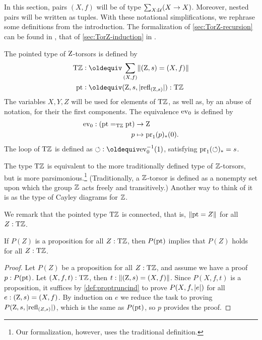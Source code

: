 \documentclass[a4paper,12pt]{amsart}
\begin{document}
{In this section, pairs $(X,f)$ will be of type $\sum_{X:\mathcal{U}}(X\to X)$.}
Moreover, nested pairs will be written as tuples.
With these notational simplifications, we rephrase some definitions from the introduction.
{The formalization of \cref{sec:TorZ-recursion} can be found in \cite{circlerec-Dan},
that of \cref{sec:TorZ-induction} in \cite{circleind-Dan}.}

\begin{definition}\label{def:TorZ}
  The pointed type of $\mathrm{Z}$-torsors is defined by
  \begin{align*}
    \TorZ &\defeq \sum_{(X,f)}\Trunc{(\zet,s)=(X,f)}  \\
    \pt & \defeq (\zet,s,\trunc{\refl{(\zet,s)}}) : \TorZ
  \end{align*}
  The variables $X,Y,Z$ will be used for elements of ${\mathrm{T}\mathbb{Z}}$,
  as well as, by an abuse of notation, for their the first components.
  The equivalence $\mathrm{ev}_0$ is defined by
  \begin{align*}
    \mathrm{ev}_0: ({\mathord{\mathrm{pt}}} =_{\mathrm{T}\mathbb{Z}} {\mathord{\mathrm{pt}}}) & \to\mathrm{Z} \\
    p & \mapsto \operatorname{pr}_1(p)_*(0).
  \end{align*}
  The loop of ${\mathrm{T}\mathbb{Z}}$ is defined as ${\Zloop}\defeq\ev_0^{-1}(1)$,
  satisfying $\operatorname{pr}_1({\circlearrowleft})_* = s$.
\end{definition}

The type ${\mathrm{T}\mathbb{Z}}$ is equivalent to the more traditionally defined
type of $\mathbb{Z}$-torsors, but is more parsimonious.\footnote{Our formalization, however, uses the traditional definition.}
(Traditionally, a $\mathbb{Z}$-torsor is defined as a nonempty set upon which the group $\mathbb{Z}$ acts freely and transitively.)
Another way to think of it is as the type of Cayley diagrams for $\mathbb{Z}$.

We remark that the pointed type ${\mathrm{T}\mathbb{Z}}$ is connected, that is, $\lVert{\mathord{\mathrm{pt}}}=Z\rVert$ for all $Z:{\mathrm{T}\mathbb{Z}}$.


\begin{lemma}\label{lem:dep-elim-TorZ}
If $P(Z)$ is a proposition for all $Z:{\mathrm{T}\mathbb{Z}}$, then $P({\mathord{\mathrm{pt}}})$ implies that $P(Z)$ holds for all $Z:{\mathrm{T}\mathbb{Z}}$.
\end{lemma}

\begin{proof}
Let $P(Z)$ be a proposition for all $Z:{\mathrm{T}\mathbb{Z}}$, and assume we have a proof
$p:P({\mathord{\mathrm{pt}}})$. Let $(X,f,t):{\mathrm{T}\mathbb{Z}}$, then $t :\lVert(\mathrm{Z},s)=(X,f)\rVert$.
Since $P(X,f,t)$ is a proposition, it suffices by \cref{def:proptruncind}
to prove $P(X,f,\lvert e\rvert)$ for all $e:(\mathrm{Z},s)=(X,f)$.
By induction on $e$ we reduce the task to proving $P(\mathrm{Z},s,\lvert\mathop{{\mathrm{refl}}_{(Z,s)}}\rvert)$, which is
the same as $P({\mathord{\mathrm{pt}}})$, so $p$ provides the proof.
\end{proof}
\end{document}
